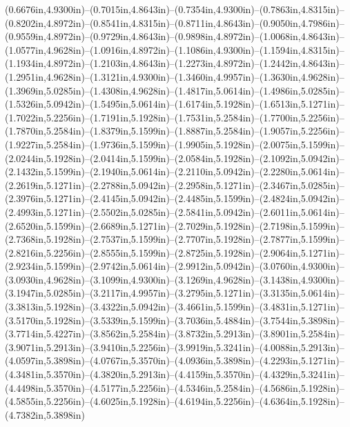 (0.6676in,4.9300in)--(0.7015in,4.8643in)--(0.7354in,4.9300in)--(0.7863in,4.8315in)--(0.8202in,4.8972in)--(0.8541in,4.8315in)--(0.8711in,4.8643in)--(0.9050in,4.7986in)--(0.9559in,4.8972in)--(0.9729in,4.8643in)--(0.9898in,4.8972in)--(1.0068in,4.8643in)--(1.0577in,4.9628in)--(1.0916in,4.8972in)--(1.1086in,4.9300in)--(1.1594in,4.8315in)--(1.1934in,4.8972in)--(1.2103in,4.8643in)--(1.2273in,4.8972in)--(1.2442in,4.8643in)--(1.2951in,4.9628in)--(1.3121in,4.9300in)--(1.3460in,4.9957in)--(1.3630in,4.9628in)--(1.3969in,5.0285in)--(1.4308in,4.9628in)--(1.4817in,5.0614in)--(1.4986in,5.0285in)--(1.5326in,5.0942in)--(1.5495in,5.0614in)--(1.6174in,5.1928in)--(1.6513in,5.1271in)--(1.7022in,5.2256in)--(1.7191in,5.1928in)--(1.7531in,5.2584in)--(1.7700in,5.2256in)--(1.7870in,5.2584in)--(1.8379in,5.1599in)--(1.8887in,5.2584in)--(1.9057in,5.2256in)--(1.9227in,5.2584in)--(1.9736in,5.1599in)--(1.9905in,5.1928in)--(2.0075in,5.1599in)--(2.0244in,5.1928in)--(2.0414in,5.1599in)--(2.0584in,5.1928in)--(2.1092in,5.0942in)--(2.1432in,5.1599in)--(2.1940in,5.0614in)--(2.2110in,5.0942in)--(2.2280in,5.0614in)--(2.2619in,5.1271in)--(2.2788in,5.0942in)--(2.2958in,5.1271in)--(2.3467in,5.0285in)--(2.3976in,5.1271in)--(2.4145in,5.0942in)--(2.4485in,5.1599in)--(2.4824in,5.0942in)--(2.4993in,5.1271in)--(2.5502in,5.0285in)--(2.5841in,5.0942in)--(2.6011in,5.0614in)--(2.6520in,5.1599in)--(2.6689in,5.1271in)--(2.7029in,5.1928in)--(2.7198in,5.1599in)--(2.7368in,5.1928in)--(2.7537in,5.1599in)--(2.7707in,5.1928in)--(2.7877in,5.1599in)--(2.8216in,5.2256in)--(2.8555in,5.1599in)--(2.8725in,5.1928in)--(2.9064in,5.1271in)--(2.9234in,5.1599in)--(2.9742in,5.0614in)--(2.9912in,5.0942in)--(3.0760in,4.9300in)--(3.0930in,4.9628in)--(3.1099in,4.9300in)--(3.1269in,4.9628in)--(3.1438in,4.9300in)--(3.1947in,5.0285in)--(3.2117in,4.9957in)--(3.2795in,5.1271in)--(3.3135in,5.0614in)--(3.3813in,5.1928in)--(3.4322in,5.0942in)--(3.4661in,5.1599in)--(3.4831in,5.1271in)--(3.5170in,5.1928in)--(3.5339in,5.1599in)--(3.7036in,5.4884in)--(3.7544in,5.3898in)--(3.7714in,5.4227in)--(3.8562in,5.2584in)--(3.8732in,5.2913in)--(3.8901in,5.2584in)--(3.9071in,5.2913in)--(3.9410in,5.2256in)--(3.9919in,5.3241in)--(4.0088in,5.2913in)--(4.0597in,5.3898in)--(4.0767in,5.3570in)--(4.0936in,5.3898in)--(4.2293in,5.1271in)--(4.3481in,5.3570in)--(4.3820in,5.2913in)--(4.4159in,5.3570in)--(4.4329in,5.3241in)--(4.4498in,5.3570in)--(4.5177in,5.2256in)--(4.5346in,5.2584in)--(4.5686in,5.1928in)--(4.5855in,5.2256in)--(4.6025in,5.1928in)--(4.6194in,5.2256in)--(4.6364in,5.1928in)--(4.7382in,5.3898in) 
